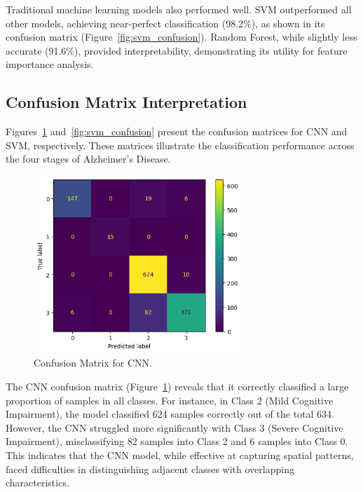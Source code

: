 \documentclass[runningheads]{llncs}
\begin{document}
Traditional machine learning models also performed well. SVM outperformed all other models, achieving near-perfect classification (98.2\%), as shown in its confusion matrix (Figure~\ref{fig:svm_confusion}). Random Forest, while slightly less accurate (91.6\%), provided interpretability, demonstrating its utility for feature importance analysis.

\subsection{Confusion Matrix Interpretation}

Figures~\ref{fig:cnn_confusion} and~\ref{fig:svm_confusion} present the confusion matrices for CNN and SVM, respectively. These matrices illustrate the classification performance across the four stages of Alzheimer’s Disease.

\begin{figure}[htbp]
    \centering
    \includegraphics[width=0.7\textwidth]{cnn_confusion_matrix.png}
    \caption{Confusion Matrix for CNN.}
    \label{fig:cnn_confusion}
\end{figure}

The CNN confusion matrix (Figure~\ref{fig:cnn_confusion}) reveals that it correctly classified a large proportion of samples in all classes. For instance, in Class 2 (Mild Cognitive Impairment), the model classified 624 samples correctly out of the total 634. However, the CNN struggled more significantly with Class 3 (Severe Cognitive Impairment), misclassifying 82 samples into Class 2 and 6 samples into Class 0. This indicates that the CNN model, while effective at capturing spatial patterns, faced difficulties in distinguishing adjacent classes with overlapping characteristics.
\end{document}
